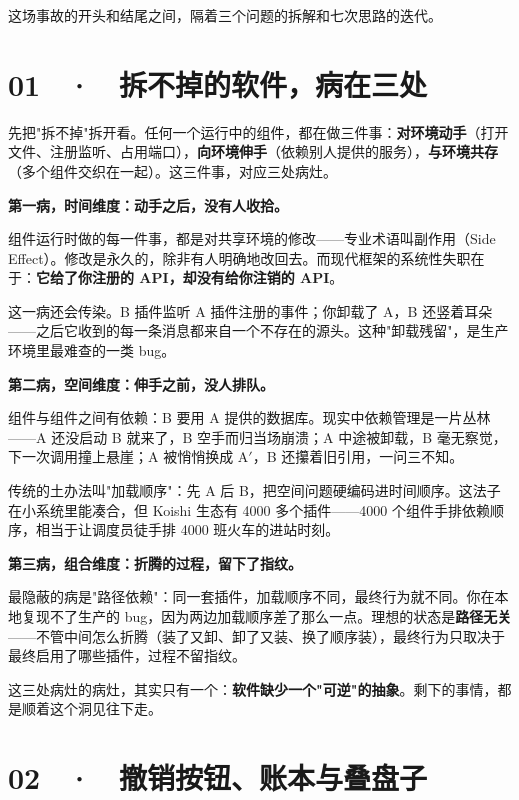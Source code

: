 \documentclass[11pt,a4paper]{article}
\begin{document}
这场事故的开头和结尾之间，隔着三个问题的拆解和七次思路的迭代。

\section*{01 \ · \ 拆不掉的软件，病在三处}

先把"拆不掉"拆开看。任何一个运行中的组件，都在做三件事：\textbf{对环境动手}（打开文件、注册监听、占用端口），\textbf{向环境伸手}（依赖别人提供的服务），\textbf{与环境共存}（多个组件交织在一起）。这三件事，对应三处病灶。

\textbf{第一病，时间维度：动手之后，没有人收拾。}

组件运行时做的每一件事，都是对共享环境的修改——专业术语叫副作用（Side Effect）。修改是永久的，除非有人明确地改回去。而现代框架的系统性失职在于：\textbf{它给了你注册的 API，却没有给你注销的 API}。

\begin{center}

\end{center}

这一病还会传染。B 插件监听 A 插件注册的事件；你卸载了 A，B 还竖着耳朵——之后它收到的每一条消息都来自一个不存在的源头。这种"卸载残留"，是生产环境里最难查的一类 bug。

\textbf{第二病，空间维度：伸手之前，没人排队。}

组件与组件之间有依赖：B 要用 A 提供的数据库。现实中依赖管理是一片丛林——A 还没启动 B 就来了，B 空手而归当场崩溃；A 中途被卸载，B 毫无察觉，下一次调用撞上悬崖；A 被悄悄换成 A$'$，B 还攥着旧引用，一问三不知。

传统的土办法叫"加载顺序"：先 A 后 B，把空间问题硬编码进时间顺序。这法子在小系统里能凑合，但 Koishi 生态有 4000 多个插件——4000 个组件手排依赖顺序，相当于让调度员徒手排 4000 班火车的进站时刻。

\textbf{第三病，组合维度：折腾的过程，留下了指纹。}

最隐蔽的病是"路径依赖"：同一套插件，加载顺序不同，最终行为就不同。你在本地复现不了生产的 bug，因为两边加载顺序差了那么一点。理想的状态是\textbf{路径无关}——不管中间怎么折腾（装了又卸、卸了又装、换了顺序装），最终行为只取决于最终启用了哪些插件，过程不留指纹。

这三处病灶的病灶，其实只有一个：\textbf{软件缺少一个"可逆"的抽象}。剩下的事情，都是顺着这个洞见往下走。

\section*{02 \ · \ 撤销按钮、账本与叠盘子}
\end{document}
